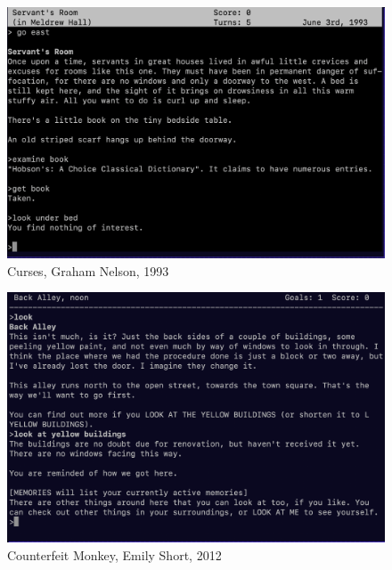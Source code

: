 \begin{frame}[b]
    \begin{figure}
        \centering
        \includegraphics[width=\textwidth,keepaspectratio]{../images/curses.png}
        \caption*{Curses, Graham Nelson, 1993}
    \end{figure}
\end{frame}

\begin{frame}[b]
    \begin{figure}
        \centering
        \includegraphics[width=\textwidth,keepaspectratio]{../images/counterfeit_monkey.png}
        \caption*{Counterfeit Monkey, Emily Short, 2012}
    \end{figure}
\end{frame}

